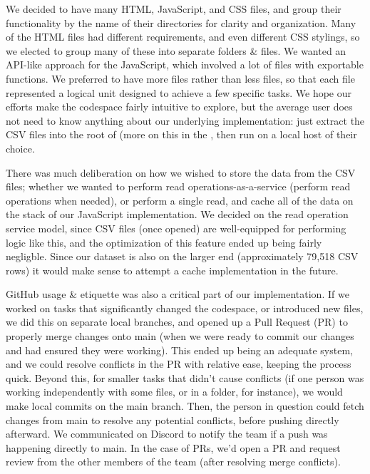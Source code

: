 \documentclass{article}
\begin{document}
    We decided to have many HTML, JavaScript, and CSS files, and group their functionality by the name of their directories for clarity and organization. Many of the HTML files had different requirements, and even different CSS stylings, so we elected to group many of these into separate folders \& files. We wanted an API-like approach for the JavaScript, which involved a lot of files with exportable functions. We preferred to have more files rather than less files, so that each file represented a logical unit designed to achieve a few specific tasks. We hope our efforts make the codespace fairly intuitive to explore, but the average user does not need to know anything about our underlying implementation: just extract the CSV files into the root of  (more on this in the , then run  on a local host of their choice. 
    
    There was much deliberation on how we wished to store the data from the CSV files; whether we wanted to perform read operations-as-a-service (perform read operations when needed), or perform a single read, and cache all of the data on the stack of our JavaScript implementation. We decided on the read operation service model, since CSV files (once opened) are well-equipped for performing logic like this, and the optimization of this feature ended up being fairly negligble. Since our dataset is also on the larger end (approximately 79,518 CSV rows) it would make sense to attempt a cache implementation in the future.
    
    GitHub usage \& etiquette was also a critical part of our implementation. If we worked on tasks that significantly changed the codespace, or introduced new files, we did this on separate local branches, and opened up a Pull Request (PR) to properly merge changes onto main (when we were ready to commit our changes and had ensured they were working). This ended up being an adequate system, and we could resolve conflicts in the PR with relative ease, keeping the process quick. Beyond this, for smaller tasks that didn't cause conflicts (if one person was working independently with some files, or in a folder, for instance), we would make local commits on the main branch. Then, the person in question could fetch changes from main to resolve any potential conflicts, before pushing directly afterward. We communicated on Discord to notify the team if a push was happening directly to main. In the case of PRs, we'd open a PR and request review from the other members of the team (after resolving merge conflicts).
\end{document}
